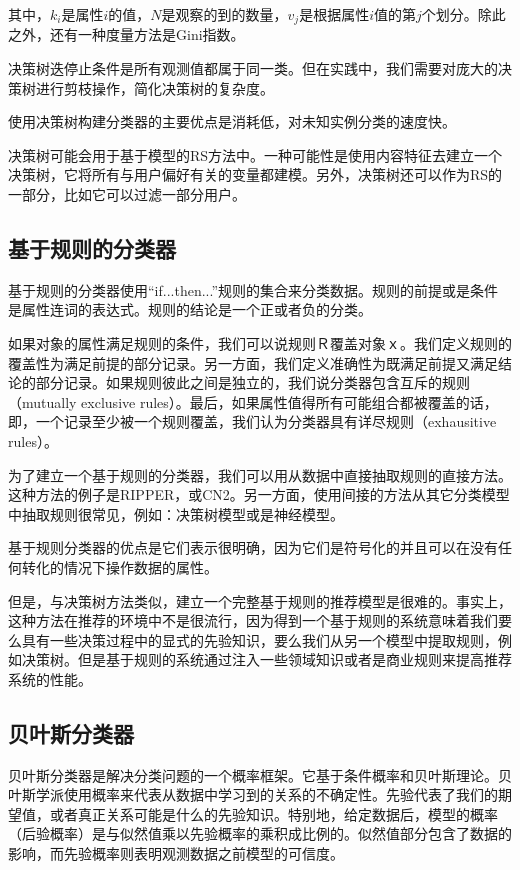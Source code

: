 \documentclass{article}
\begin{document}
其中，$k_i$是属性$i$的值，$N$是观察的到的数量，$v_j$是根据属性$i$值的第$j$个划分。除此之外，还有一种度量方法是Gini指数。

决策树迭停止条件是所有观测值都属于同一类。但在实践中，我们需要对庞大的决策树进行剪枝操作，简化决策树的复杂度。

使用决策树构建分类器的主要优点是消耗低，对未知实例分类的速度快。

决策树可能会用于基于模型的RS方法中。一种可能性是使用内容特征去建立一个决策树，它将所有与用户偏好有关的变量都建模。另外，决策树还可以作为RS的一部分，比如它可以过滤一部分用户。

\subsection{基于规则的分类器}
基于规则的分类器使用“if...then...”规则的集合来分类数据。规则的前提或是条件是属性连词的表达式。规则的结论是一个正或者负的分类。

如果对象的属性满足规则的条件，我们可以说规则Ｒ覆盖对象ｘ。我们定义规则的覆盖性为满足前提的部分记录。另一方面，我们定义准确性为既满足前提又满足结论的部分记录。如果规则彼此之间是独立的，我们说分类器包含互斥的规则（mutually exclusive rules）。最后，如果属性值得所有可能组合都被覆盖的话，即，一个记录至少被一个规则覆盖，我们认为分类器具有详尽规则（exhausitive rules）。

为了建立一个基于规则的分类器，我们可以用从数据中直接抽取规则的直接方法。这种方法的例子是RIPPER，或CN2。另一方面，使用间接的方法从其它分类模型中抽取规则很常见，例如：决策树模型或是神经模型。

基于规则分类器的优点是它们表示很明确，因为它们是符号化的并且可以在没有任何转化的情况下操作数据的属性。

但是，与决策树方法类似，建立一个完整基于规则的推荐模型是很难的。事实上，这种方法在推荐的环境中不是很流行，因为得到一个基于规则的系统意味着我们要么具有一些决策过程中的显式的先验知识，要么我们从另一个模型中提取规则，例如决策树。但是基于规则的系统通过注入一些领域知识或者是商业规则来提高推荐系统的性能。

\subsection{贝叶斯分类器}
贝叶斯分类器是解决分类问题的一个概率框架。它基于条件概率和贝叶斯理论。贝叶斯学派使用概率来代表从数据中学习到的关系的不确定性。先验代表了我们的期望值，或者真正关系可能是什么的先验知识。特别地，给定数据后，模型的概率（后验概率）是与似然值乘以先验概率的乘积成比例的。似然值部分包含了数据的影响，而先验概率则表明观测数据之前模型的可信度。
\end{document}
